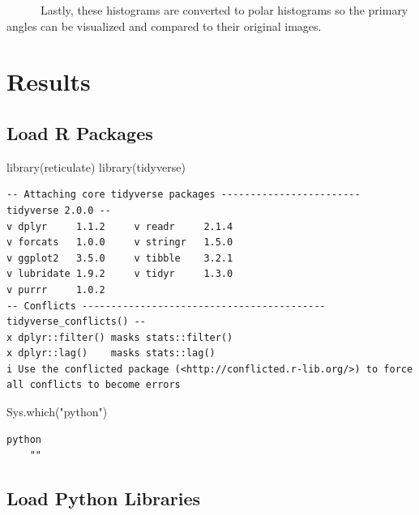 \documentclass[
  letterpaper,
  DIV=11,
  numbers=noendperiod]{scrreprt}
\newenvironment{Shaded}{\begin{snugshade}}{\end{snugshade}}
\newcommand{\FunctionTok}[1]{\textcolor[rgb]{0.28,0.35,0.67}{#1}}
\newcommand{\NormalTok}[1]{\textcolor[rgb]{0.00,0.23,0.31}{#1}}
\newcommand{\StringTok}[1]{\textcolor[rgb]{0.13,0.47,0.30}{#1}}
\begin{document}
~~~~~~Lastly, these histograms are converted to polar histograms so the
primary angles can be visualized and compared to their original images.


\hypertarget{results}{%
\chapter{Results}\label{results}}

\hypertarget{load-r-packages}{%
\section{Load R Packages}\label{load-r-packages}}

\begin{Shaded}
\begin{Highlighting}[]
\FunctionTok{library}\NormalTok{(reticulate)}
\FunctionTok{library}\NormalTok{(tidyverse)}
\end{Highlighting}
\end{Shaded}

\begin{verbatim}
-- Attaching core tidyverse packages ------------------------ tidyverse 2.0.0 --
v dplyr     1.1.2     v readr     2.1.4
v forcats   1.0.0     v stringr   1.5.0
v ggplot2   3.5.0     v tibble    3.2.1
v lubridate 1.9.2     v tidyr     1.3.0
v purrr     1.0.2     
-- Conflicts ------------------------------------------ tidyverse_conflicts() --
x dplyr::filter() masks stats::filter()
x dplyr::lag()    masks stats::lag()
i Use the conflicted package (<http://conflicted.r-lib.org/>) to force all conflicts to become errors
\end{verbatim}

\begin{Shaded}
\begin{Highlighting}[]
\FunctionTok{Sys.which}\NormalTok{(}\StringTok{"python"}\NormalTok{)}
\end{Highlighting}
\end{Shaded}

\begin{verbatim}
python 
    "" 
\end{verbatim}

\hypertarget{load-python-libraries}{%
\section{Load Python Libraries}\label{load-python-libraries}}
\end{document}
